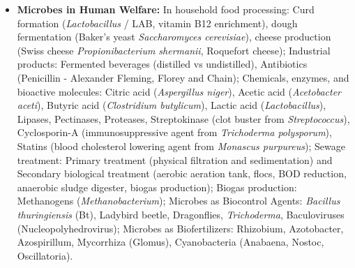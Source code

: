 \documentclass[11pt,a4paper]{article}
\begin{document}
\begin{itemize}
  \item \textbf{Microbes in Human Welfare:} In household food processing: Curd formation (\textit{Lactobacillus} / LAB, vitamin B12 enrichment), dough fermentation (Baker's yeast \textit{Saccharomyces cerevisiae}), cheese production (Swiss cheese \textit{Propionibacterium shermanii}, Roquefort cheese); Industrial products: Fermented beverages (distilled vs undistilled), Antibiotics (Penicillin - Alexander Fleming, Florey and Chain); Chemicals, enzymes, and bioactive molecules: Citric acid (\textit{Aspergillus niger}), Acetic acid (\textit{Acetobacter aceti}), Butyric acid (\textit{Clostridium butylicum}), Lactic acid (\textit{Lactobacillus}), Lipases, Pectinases, Proteases, Streptokinase (clot buster from \textit{Streptococcus}), Cyclosporin-A (immunosuppressive agent from \textit{Trichoderma polysporum}), Statins (blood cholesterol lowering agent from \textit{Monascus purpureus}); Sewage treatment: Primary treatment (physical filtration and sedimentation) and Secondary biological treatment (aerobic aeration tank, flocs, BOD reduction, anaerobic sludge digester, biogas production); Biogas production: Methanogens (\textit{Methanobacterium}); Microbes as Biocontrol Agents: \textit{Bacillus thuringiensis} (Bt), Ladybird beetle, Dragonflies, \textit{Trichoderma}, Baculoviruses (Nucleopolyhedrovirus); Microbes as Biofertilizers: Rhizobium, Azotobacter, Azospirillum, Mycorrhiza (Glomus), Cyanobacteria (Anabaena, Nostoc, Oscillatoria).
\end{itemize}
\end{document}
